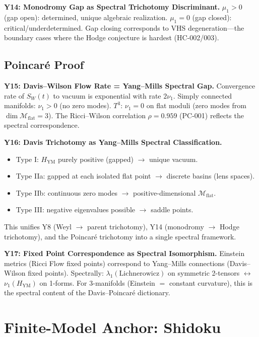 \documentclass[11pt]{article}
\theoremstyle{definition}
\theoremstyle{remark}
\newcommand{\Mflat}{\mathcal{M}_{\mathrm{flat}}}
\newcommand{\HYM}{H_{\mathrm{YM}}}
\newcommand{\SW}{S_W}
\begin{document}
\textbf{Y14: Monodromy Gap as Spectral Trichotomy Discriminant.}
$\mu_1 > 0$ (gap open): determined, unique algebraic realization. $\mu_1 = 0$ (gap closed): critical/underdetermined. Gap closing corresponds to VHS degeneration---the boundary cases where the Hodge conjecture is hardest (HC-002/003).

\subsection{Poincar\'{e} Proof}

\textbf{Y15: Davis--Wilson Flow Rate = Yang--Mills Spectral Gap.}
Convergence rate of $\SW(t)$ to vacuum is exponential with rate $2\nu_1$. Simply connected manifolds: $\nu_1 > 0$ (no zero modes). $T^3$: $\nu_1 = 0$ on flat moduli (zero modes from $\dim\Mflat = 3$). The Ricci--Wilson correlation $\rho = 0.959$ (PC-001) reflects the spectral correspondence.

\textbf{Y16: Davis Trichotomy as Yang--Mills Spectral Classification.}
\begin{itemize}[nosep]
\item Type I: $\HYM$ purely positive (gapped) $\to$ unique vacuum.
\item Type IIa: gapped at each isolated flat point $\to$ discrete basins (lens spaces).
\item Type IIb: continuous zero modes $\to$ positive-dimensional $\Mflat$.
\item Type III: negative eigenvalues possible $\to$ saddle points.
\end{itemize}
This unifies Y8 (Weyl $\to$ parent trichotomy), Y14 (monodromy $\to$ Hodge trichotomy), and the Poincar\'{e} trichotomy into a single spectral framework.

\textbf{Y17: Fixed Point Correspondence as Spectral Isomorphism.}
Einstein metrics (Ricci Flow fixed points) correspond to Yang--Mills connections (Davis--Wilson fixed points). Spectrally: $\lambda_1(\text{Lichnerowicz})$ on symmetric 2-tensors $\leftrightarrow$ $\nu_1(\HYM)$ on 1-forms. For 3-manifolds (Einstein $=$ constant curvature), this is the spectral content of the Davis--Poincar\'{e} dictionary.


\section{Finite-Model Anchor: Shidoku}
\label{sec:finite}
\end{document}
